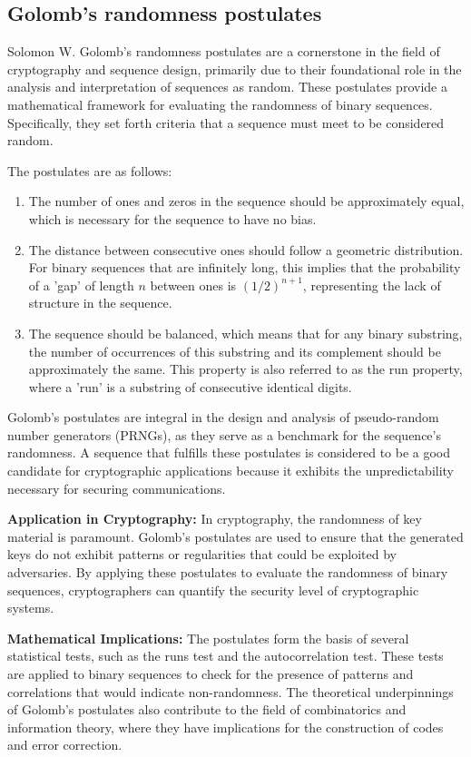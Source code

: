 \documentclass[12pt,openany]{book}
\theoremstyle{definition}
\begin{document}
	
	
	
\newpage
\subsection{Golomb’s randomness postulates}
Solomon W. Golomb's randomness postulates are a cornerstone in the field of cryptography and sequence design, primarily due to their foundational role in the analysis and interpretation of sequences as random. These postulates provide a mathematical framework for evaluating the randomness of binary sequences. Specifically, they set forth criteria that a sequence must meet to be considered random. 

The postulates are as follows:

\begin{enumerate}
	\item The number of ones and zeros in the sequence should be approximately equal, which is necessary for the sequence to have no bias.
	\item The distance between consecutive ones should follow a geometric distribution. For binary sequences that are infinitely long, this implies that the probability of a 'gap' of length \( n \) between ones is \( (1/2)^{n+1} \), representing the lack of structure in the sequence.
	\item The sequence should be balanced, which means that for any binary substring, the number of occurrences of this substring and its complement should be approximately the same. This property is also referred to as the run property, where a 'run' is a substring of consecutive identical digits.
\end{enumerate}

Golomb’s postulates are integral in the design and analysis of pseudo-random number generators (PRNGs), as they serve as a benchmark for the sequence's randomness. A sequence that fulfills these postulates is considered to be a good candidate for cryptographic applications because it exhibits the unpredictability necessary for securing communications.

\textbf{Application in Cryptography:}
In cryptography, the randomness of key material is paramount. Golomb's postulates are used to ensure that the generated keys do not exhibit patterns or regularities that could be exploited by adversaries. By applying these postulates to evaluate the randomness of binary sequences, cryptographers can quantify the security level of cryptographic systems.

\textbf{Mathematical Implications:}
The postulates form the basis of several statistical tests, such as the runs test and the autocorrelation test. These tests are applied to binary sequences to check for the presence of patterns and correlations that would indicate non-randomness. The theoretical underpinnings of Golomb's postulates also contribute to the field of combinatorics and information theory, where they have implications for the construction of codes and error correction.
\end{document}
